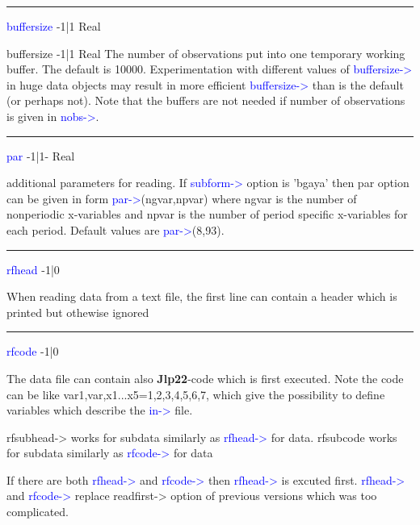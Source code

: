 \vspace{0.3cm}
\hrule
\vspace{0.3cm}
\noindent \textcolor{blue}{buffersize} \tabto{3cm} -1|1 \tabto{5cm}  Real \tabto{7cm}
\begin{changemargin}{3cm}{0cm}
\noindent \noindent buffersize \tabto{3cm} -1|1 \tabto{5cm}  Real \tabto{7cm}
The number of observations put into one temporary working buffer. The default
is 10000. Experimentation with different values of \textcolor{blue}{buffersize->} in huge data
objects may result in more efficient \textcolor{blue}{buffersize->} than is the default (or perhaps
not). Note that the buffers are not needed if number of observations is given in
\textcolor{blue}{nobs->}.

\end{changemargin}
\vspace{0.3cm}
\hrule
\vspace{0.3cm}
\noindent \textcolor{blue}{par} \tabto{3cm} -1|1- \tabto{5cm}   Real \tabto{7cm}
\begin{changemargin}{3cm}{0cm}
\noindent additional parameters for reading. If \textcolor{blue}{subform->} option is 'bgaya' then par
option can be given in form \textcolor{blue}{par->}(ngvar,npvar) where ngvar is the number
of nonperiodic x-variables and npvar is the number of period specific x-variables
for each period. Default values are \textcolor{blue}{par->}(8,93).

\end{changemargin}
\vspace{0.3cm}
\hrule
\vspace{0.3cm}
\noindent \textcolor{blue}{rfhead}  \tabto{3cm} -1|0 \tabto{5cm}    \tabto{7cm}
\begin{changemargin}{3cm}{0cm}
\noindent  When reading data from a text file, the first line can contain a header which is
printed but othewise ignored

\end{changemargin}
\vspace{0.3cm}
\hrule
\vspace{0.3cm}
\noindent \textcolor{blue}{rfcode}  \tabto{3cm} -1|0 \tabto{5cm}    \tabto{7cm}
\begin{changemargin}{3cm}{0cm}
\noindent The data file can contain also \textbf{Jlp22}-code which is first executed. Note the code can
be like var1,var,x1...x5=1,2,3,4,5,6,7, which give the possibility to
define variables which describe the \textcolor{blue}{in->} file.


rfsubhead-> works for subdata similarly as \textcolor{blue}{rfhead->} for data.
rfsubcode works for subdata similarly as \textcolor{blue}{rfcode->} for data

If there are both \textcolor{blue}{rfhead->} and \textcolor{blue}{rfcode->} then \textcolor{blue}{rfhead->} is excuted first.
\textcolor{blue}{rfhead->} and \textcolor{blue}{rfcode->} replace readfirst-> option  of previous versions which was too
complicated.
\end{changemargin}
